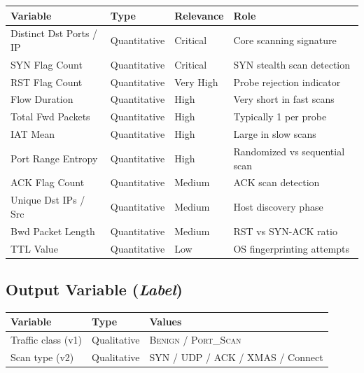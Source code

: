 \documentclass[12pt,a4paper]{article}
\begin{document}
\begin{table}[h!]
\centering
\small
\begin{tabular}{L{4cm} C{2.5cm} C{2.5cm} L{4cm}}
  \toprule
  \textbf{Variable} & \textbf{Type} & \textbf{Relevance} & \textbf{Role} \\
  \midrule
  Distinct Dst Ports / IP & Quantitative & Critical   & Core scanning signature \\
  SYN Flag Count          & Quantitative & Critical   & SYN stealth scan detection \\
  RST Flag Count          & Quantitative & Very High  & Probe rejection indicator \\
  Flow Duration           & Quantitative & High       & Very short in fast scans \\
  Total Fwd Packets       & Quantitative & High       & Typically 1 per probe \\
  IAT Mean                & Quantitative & High       & Large in slow scans \\
  Port Range Entropy      & Quantitative & High       & Randomized vs sequential scan \\
  ACK Flag Count          & Quantitative & Medium     & ACK scan detection \\
  Unique Dst IPs / Src    & Quantitative & Medium     & Host discovery phase \\
  Bwd Packet Length       & Quantitative & Medium     & RST vs SYN-ACK ratio \\
  TTL Value               & Quantitative & Low        & OS fingerprinting attempts \\
  \bottomrule
\end{tabular}
\end{table}

\subsection{Output Variable (\textit{Label})}

\begin{table}[h!]
\centering
\small
\begin{tabular}{L{4cm} C{2.5cm} L{7cm}}
  \toprule
  \textbf{Variable} & \textbf{Type} & \textbf{Values} \\
  \midrule
  Traffic class (v1) & Qualitative & \textsc{Benign} / \textsc{Port\_Scan} \\
  Scan type (v2)     & Qualitative & SYN / UDP / ACK / XMAS / Connect \\
  \bottomrule
\end{tabular}
\end{table}
\end{document}
